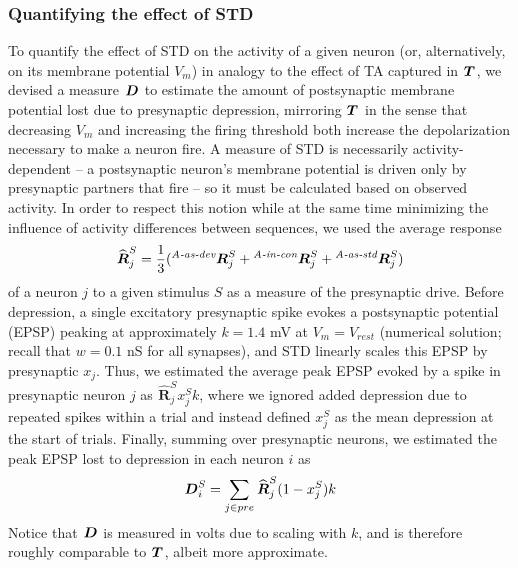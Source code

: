 \documentclass[9pt,lineno,onehalfspacing]{elife}
\newcommand{\dev}{\textit{A-as-dev}}
\newcommand{\msc}{\textit{A-in-con}}
\newcommand{\std}{\textit{A-as-std}}
\newcommand{\ifstringequal}[4]{%
  \ifnum\pdfstrcmp{#1}{#2}=0
  #3%
  \else
  #4%
  \fi
}
\newcommand{\seqreplace}[1]{\ifstringequal{dev}{#1}{\dev}{%
    \ifstringequal{std}{#1}{\std}{%
        \ifstringequal{msc}{#1}{\msc}{#1}%
    }%
}}
\newcommand{\R}[3][]{{}^{\seqreplace{#1}}_{}\boldsymbol R^{#2}_{#3}}
\newcommand{\T}[3][]{{}^{\seqreplace{#1}}_{}\boldsymbol T^{#2}_{#3}}
\newcommand{\D}[3][]{{}^{\seqreplace{#1}}_{}\boldsymbol D^{#2}_{#3}}
\newcommand{\Rhat}[3][]{{}^{#1}_{}\widehat{\boldsymbol R}^{#2}_{#3}}
\begin{document}
\subsubsection{Quantifying the effect of STD}\label{sec:D}
To quantify the effect of STD on the activity of a given neuron (or, alternatively, on its membrane potential $V_m$) in analogy to the effect of TA captured in $\T{}{}$, we devised a measure $\D{}{}$ to estimate the amount of postsynaptic membrane potential lost due to presynaptic depression, mirroring $\T{}{}$ in the sense that decreasing $V_m$ and increasing the firing threshold both increase the depolarization necessary to make a neuron fire. A measure of STD is necessarily activity-dependent -- a postsynaptic neuron's membrane potential is driven only by presynaptic partners that fire -- so it must be calculated based on observed activity. In order to respect this notion while at the same time minimizing the influence of activity differences between sequences, we used the average response
\begin{equation}
    \Rhat{S}{j} = \frac{1}{3} (\R[dev]{S}{j} + \R[msc]{S}{j} + \R[std]{S}{j}) \label{eq:Rhat}
\end{equation}
of a neuron $j$ to a given stimulus $S$ as a measure of the presynaptic drive. Before depression, a single excitatory presynaptic spike evokes a postsynaptic potential (EPSP) peaking at approximately $k = 1.4$ mV at $V_m = V_{rest}$ (numerical solution; recall that $w = 0.1$ nS for all synapses), and STD linearly scales this EPSP by presynaptic $x_j$. Thus, we estimated the average peak EPSP evoked by a spike in presynaptic neuron $j$ as $\Rhat{S}{j} x_j^S k$, where we ignored added depression due to repeated spikes within a trial and instead defined $x_j^S$ as the mean depression at the start of trials. Finally, summing over presynaptic neurons, we estimated the peak EPSP lost to depression in each neuron $i$ as
\begin{equation}
    \D{S}{i} = \sum_{j \in pre} \Rhat{S}{j} (1-x_j^S) k \label{eq:D}
\end{equation}
Notice that $\D{}{}$ is measured in volts due to scaling with $k$, and is therefore roughly comparable to $\T{}{}$, albeit more approximate.
\end{document}
